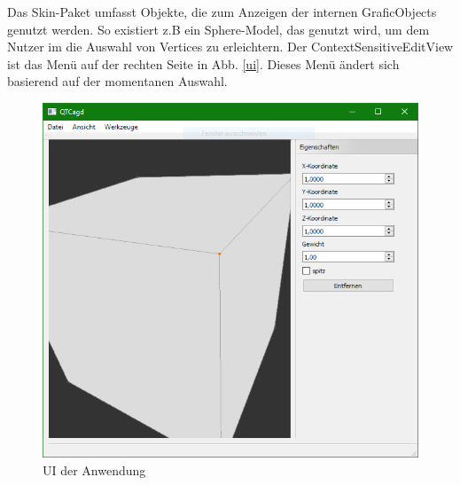 Das Skin-Paket umfasst Objekte, die zum Anzeigen der internen GraficObjects genutzt werden. 
So existiert z.B ein Sphere-Model, das genutzt wird, um dem Nutzer im die Auswahl von Vertices zu erleichtern. 
Der ContextSensitiveEditView ist das Menü auf der rechten Seite in Abb. \ref{ui}. Dieses Menü ändert sich basierend auf der momentanen Auswahl.

\begin{figure}[htbp]
\centering
\includegraphics[scale=0.7]{content/pictures/cadgWindow.PNG}
\caption{UI der Anwendung}
\label{fig:ui}
\end{figure}